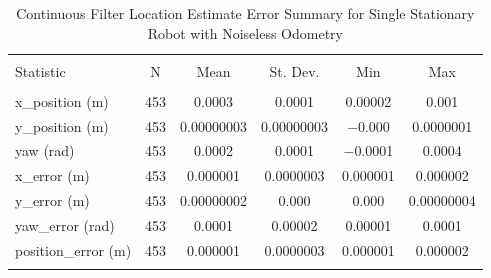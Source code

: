 
\begin{table}[htbp] \centering 
  \caption{Continuous Filter Location Estimate Error Summary for Single Stationary Robot with Noiseless Odometry} 
  \label{tab:one_stationary_noiseless_continuous_summary} 
\begin{tabular}{@{\extracolsep{5pt}}lccccc} 
\\[-1.8ex]\hline 
\hline \\[-1.8ex] 
Statistic & \multicolumn{1}{c}{N} & \multicolumn{1}{c}{Mean} & \multicolumn{1}{c}{St. Dev.} & \multicolumn{1}{c}{Min} & \multicolumn{1}{c}{Max} \\ 
\hline \\[-1.8ex] 
x\_position (m) & 453 & \num{0.0003} & \num{0.0001} & \num{0.00002} & \num{0.001} \\ 
y\_position (m) & 453 & \num{0.00000003} & \num{0.00000003} & $-$\num{0.000} & \num{0.0000001} \\ 
yaw (rad) & 453 & \num{0.0002} & \num{0.0001} & $-$\num{0.0001} & \num{0.0004} \\ 
x\_error (m) & 453 & \num{0.000001} & \num{0.0000003} & \num{0.000001} & \num{0.000002} \\ 
y\_error (m) & 453 & \num{0.00000002} & \num{0.000} & \num{0.000} & \num{0.00000004} \\
yaw\_error (rad) & 453 & \num{0.0001} & \num{0.00002} & \num{0.00001} & \num{0.0001} \\ 
position\_error (m) & 453 & \num{0.000001} & \num{0.0000003} & \num{0.000001} & \num{0.000002} \\ 
\hline \\[-1.8ex] 
\end{tabular} 
\end{table} 
